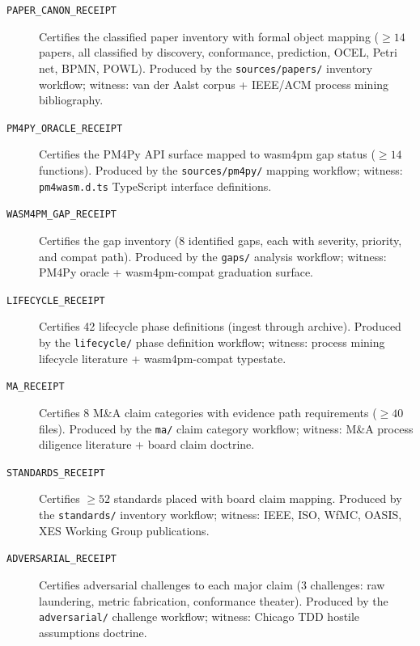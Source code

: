 \begin{description}
  \item[\texttt{PAPER\_CANON\_RECEIPT}] Certifies the classified paper inventory
        with formal object mapping ($\geq 14$ papers, all classified by discovery,
        conformance, prediction, OCEL, Petri net, BPMN, POWL). Produced by the
        \texttt{sources/papers/} inventory workflow; witness: van der Aalst corpus
        + IEEE/ACM process mining bibliography.

  \item[\texttt{PM4PY\_ORACLE\_RECEIPT}] Certifies the PM4Py API surface mapped
        to wasm4pm gap status ($\geq 14$ functions). Produced by the
        \texttt{sources/pm4py/} mapping workflow; witness: \texttt{pm4wasm.d.ts}
        TypeScript interface definitions.

  \item[\texttt{WASM4PM\_GAP\_RECEIPT}] Certifies the gap inventory (8 identified
        gaps, each with severity, priority, and compat path). Produced by the
        \texttt{gaps/} analysis workflow; witness: PM4Py oracle + wasm4pm-compat
        graduation surface.

  \item[\texttt{LIFECYCLE\_RECEIPT}] Certifies 42 lifecycle phase definitions
        (ingest through archive). Produced by the \texttt{lifecycle/} phase
        definition workflow; witness: process mining lifecycle literature +
        wasm4pm-compat typestate.

  \item[\texttt{MA\_RECEIPT}] Certifies 8 M\&A claim categories with evidence
        path requirements ($\geq 40$ files). Produced by the \texttt{ma/} claim
        category workflow; witness: M\&A process diligence literature + board
        claim doctrine.

  \item[\texttt{STANDARDS\_RECEIPT}] Certifies $\geq 52$ standards placed with
        board claim mapping. Produced by the \texttt{standards/} inventory
        workflow; witness: IEEE, ISO, WfMC, OASIS, XES Working Group publications.

  \item[\texttt{ADVERSARIAL\_RECEIPT}] Certifies adversarial challenges to each
        major claim (3 challenges: raw laundering, metric fabrication, conformance
        theater). Produced by the \texttt{adversarial/} challenge workflow;
        witness: Chicago TDD hostile assumptions doctrine.
\end{description}

